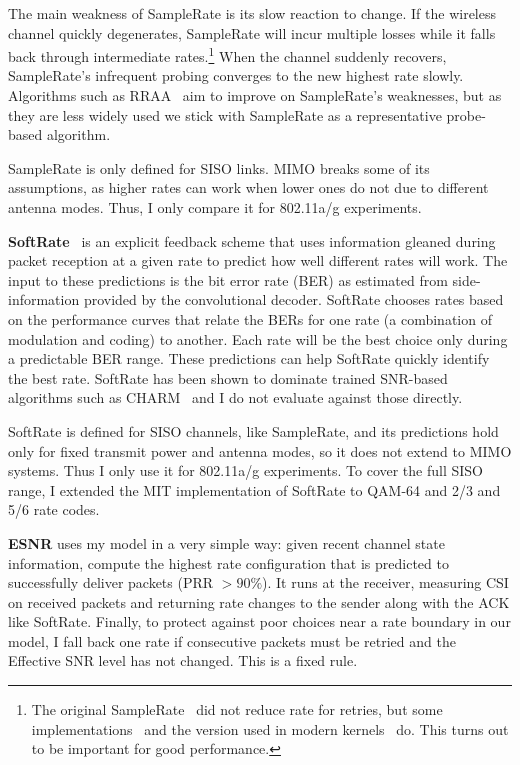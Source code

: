 The main weakness of SampleRate is its slow reaction to change. If the wireless channel quickly degenerates, SampleRate will incur multiple losses while it falls back through intermediate rates.\footnote{The original SampleRate~\cite{Bicket_SampleRate} did not reduce rate for retries, but some implementations~\cite{Judd_CHARM} and the version used in modern kernels~\cite{Minstrel} do. This turns out to be important for good performance.} When the channel suddenly recovers, SampleRate's infrequent probing converges to the new highest rate slowly. Algorithms such as 
RRAA~\cite{Wong_RRAA} aim to improve on SampleRate's weaknesses, but as they are less widely used we stick with SampleRate as a representative probe-based algorithm.

SampleRate is only defined for SISO links. MIMO breaks some of its assumptions, as higher rates can work when lower ones do not due to different antenna modes. Thus, I only compare it for 802.11a/g experiments.

\textbf{SoftRate}~\cite{Vutukuru_SoftRate} is an explicit feedback scheme that uses information gleaned during packet reception at a given rate to predict how well different rates will work. The input to these predictions is the bit error rate (BER) as estimated from side-information provided by the convolutional decoder. SoftRate chooses rates based on the performance curves that relate the BERs for one rate (a combination of modulation and coding) to another. %
Each rate will be the best choice only during a predictable BER range. These predictions can help SoftRate quickly identify the best rate. SoftRate has been shown to dominate trained SNR-based algorithms such as CHARM~\cite{Judd_CHARM} and I do not evaluate against those directly.


SoftRate is defined for SISO channels, like SampleRate, 
and its predictions hold only for fixed transmit power and antenna modes, so it does not extend to MIMO systems.
Thus I only use it for 802.11a/g experiments. To cover the full SISO range, I extended the MIT implementation of SoftRate to QAM-64 and 2/3 and 5/6 rate codes.

\textbf{ESNR} uses my model in a very simple way: given recent channel state information, compute the highest rate configuration that is predicted to successfully deliver packets (PRR $>90\%$). It runs at the receiver, measuring CSI on received packets and returning rate changes to the sender along with the ACK like SoftRate. Finally, to protect against poor choices near a rate boundary in our model, I fall back one rate if consecutive packets must be retried and the Effective SNR level has not changed. This is a fixed rule.

